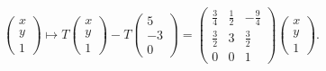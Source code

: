 \documentclass[english]{exercise}
\begin{document}
    \[
        \begin{pmatrix}
            x\\
            y\\
            1
        \end{pmatrix} \mapsto T\begin{pmatrix}
            x\\
            y\\
            1
        \end{pmatrix} - T\begin{pmatrix}
            5\\
            -3\\
            0
        \end{pmatrix} = \begin{pmatrix}
            \frac{3}{4} & \frac{1}{2} & -\frac{9}{4}\\
            \frac{3}{2} & 3 & \frac{3}{2}\\
            0 & 0 & 1
        \end{pmatrix}\begin{pmatrix}
            x\\
            y\\
            1
        \end{pmatrix}.
    \]

    
    \section{}
    
\end{document}
